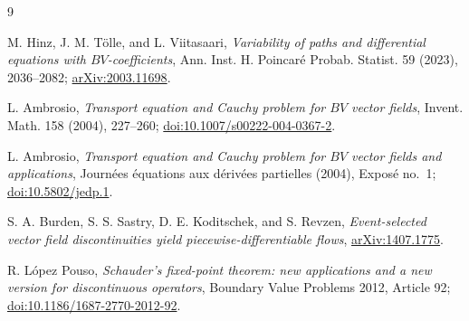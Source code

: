 \documentclass[11pt]{article}
\begin{document}
\begin{thebibliography}{9}

M. Hinz, J. M. T\"olle, and L. Viitasaari,
\emph{Variability of paths and differential equations with
$BV$-coefficients}, Ann. Inst. H. Poincar\'e Probab. Statist. 59 (2023),
2036--2082; \href{https://arxiv.org/abs/2003.11698}{arXiv:2003.11698}.

L. Ambrosio,
\emph{Transport equation and Cauchy problem for $BV$ vector fields},
Invent. Math. 158 (2004), 227--260;
\href{https://doi.org/10.1007/s00222-004-0367-2}{doi:10.1007/s00222-004-0367-2}.

L. Ambrosio,
\emph{Transport equation and Cauchy problem for $BV$ vector fields and
applications}, Journ\'ees \'equations aux d\'eriv\'ees partielles (2004),
Expos\'e no.~1;
\href{https://doi.org/10.5802/jedp.1}{doi:10.5802/jedp.1}.

S. A. Burden, S. S. Sastry, D. E. Koditschek, and S. Revzen,
\emph{Event-selected vector field discontinuities yield
piecewise-differentiable flows},
\href{https://arxiv.org/abs/1407.1775}{arXiv:1407.1775}.

R. L\'opez Pouso,
\emph{Schauder's fixed-point theorem: new applications and a new version for
discontinuous operators}, Boundary Value Problems 2012, Article 92;
\href{https://doi.org/10.1186/1687-2770-2012-92}{doi:10.1186/1687-2770-2012-92}.

\end{thebibliography}
\end{document}
